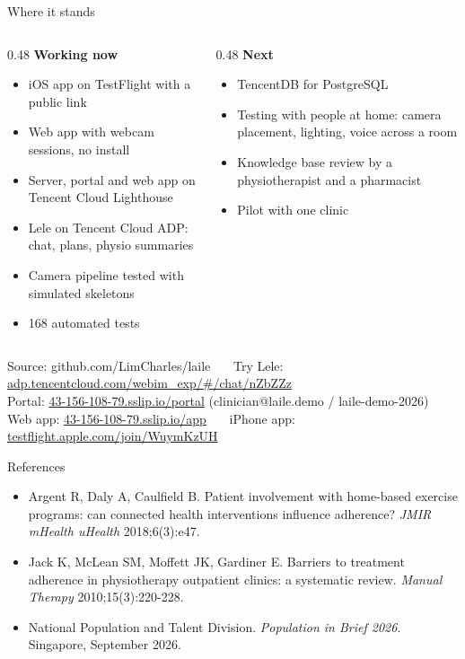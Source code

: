 \documentclass[aspectratio=169,9pt]{beamer}
\begin{document}
\begin{frame}{Where it stands}
\begin{columns}[t]
\begin{column}{0.48\textwidth}
  \textbf{\color{accent}Working now}
  \begin{itemize}
    \item iOS app on TestFlight with a public link
    \item Web app with webcam sessions, no install
    \item Server, portal and web app on Tencent Cloud Lighthouse
    \item Lele on Tencent Cloud ADP: chat, plans, physio summaries
    \item Camera pipeline tested with simulated skeletons
    \item 168 automated tests
  \end{itemize}
\end{column}
\begin{column}{0.48\textwidth}
  \textbf{\color{accent}Next}
  \begin{itemize}
    \item TencentDB for PostgreSQL
    \item Testing with people at home: camera placement, lighting, voice across a room
    \item Knowledge base review by a physiotherapist and a pharmacist
    \item Pilot with one clinic
  \end{itemize}
\end{column}
\end{columns}
\vfill
{\small\color{muted}Source: github.com/LimCharles/laile \ \textbullet\ \ Try Lele: \href{https://adp.tencentcloud.com/webim_exp/\#/chat/nZbZZz}{adp.tencentcloud.com/webim\_exp/\#/chat/nZbZZz}\\ Portal: \href{https://43-156-108-79.sslip.io/portal}{43-156-108-79.sslip.io/portal} (clinician@laile.demo / laile-demo-2026)\\ Web app: \href{https://43-156-108-79.sslip.io/app}{43-156-108-79.sslip.io/app} \ \textbullet\ \ iPhone app: \href{https://testflight.apple.com/join/WuymKzUH}{testflight.apple.com/join/WuymKzUH}}
\end{frame}

\begin{frame}{References}
\scriptsize
\begin{itemize}
  \item[{[1]}] Argent R, Daly A, Caulfield B. Patient involvement with home-based exercise programs: can connected health interventions influence adherence? \emph{JMIR mHealth uHealth} 2018;6(3):e47.
  \item[{[2]}] Jack K, McLean SM, Moffett JK, Gardiner E. Barriers to treatment adherence in physiotherapy outpatient clinics: a systematic review. \emph{Manual Therapy} 2010;15(3):220-228.
  \item[{[3]}] National Population and Talent Division. \emph{Population in Brief 2026}. Singapore, September 2026.
\end{itemize}
\end{frame}
\end{document}
